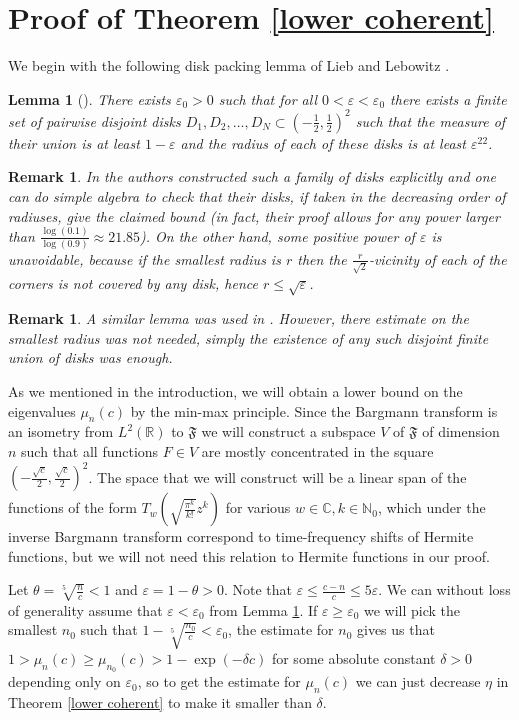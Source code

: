 \documentclass[12pt]{amsart}
\numberwithin{equation}{section}
\newcommand{\N}{\mathbb{N}}
\newcommand{\R}{\mathbb{R}}
\newcommand{\Cm}{\mathbb{C}}
\newcommand{\eps}{\varepsilon}
\newcommand{\Fo}{\mathfrak{F}}
\newtheorem{lemma}[Thm]{Lemma}
\newtheorem{remark}[Thm]{Remark}
\begin{document}
\section{Proof of Theorem \ref{lower coherent}}
We begin with the following disk packing lemma of Lieb and Lebowitz \cite{Lieb}.
\begin{lemma}[{\cite[Lemma 4.1]{Lieb}}]\label{lem}
There exists $\eps_0 > 0$ such that for all $0 < \eps < \eps_0$ there exists a finite set of pairwise disjoint disks $D_1, D_2, \ldots , D_N\subset (-\frac{1}{2}, \frac{1}{2})^2$ such that the measure of their union is at least $1-\eps$ and the radius of each of these disks is at least $\eps^{22}$. 
\end{lemma}
\begin{remark} In \cite{Lieb} the authors constructed such a family of disks explicitly and one can do simple algebra to check that their disks, if taken in the decreasing order of radiuses, give the claimed bound (in fact, their proof allows for any power larger than $\frac{\log(0.1)}{\log(0.9)}\approx 21.85$). On the other hand, some positive power of $\eps$ is unavoidable, because if the smallest radius is $r$ then the $\frac{r}{\sqrt{2}}$-vicinity of each of the corners is not covered by any disk, hence $r\le \sqrt{\eps}$.
\end{remark}
\begin{remark} A similar lemma was used in \cite{Kulikov}. However, there estimate on the smallest radius was not needed, simply the existence of any such disjoint finite union of disks was enough.
\end{remark}
As we mentioned in the introduction, we will obtain a lower bound on the eigenvalues $\mu_n(c)$ by the min-max principle. Since the Bargmann transform is an isometry from $L^2(\R)$ to $\Fo$ we will construct a subspace $V$ of $\Fo$ of dimension $n$ such that all functions $F\in V$ are mostly concentrated in the square $\left(-\frac{\sqrt{c}}{2},\frac{\sqrt{c}}{2}\right)^2$. The space that we will construct will be a linear span of the functions of the form $T_w\left(\sqrt{\frac{\pi^k}{k!}}z^k\right)$ for various $w\in\Cm, k\in\N_0$, which under the inverse Bargmann transform correspond to time-frequency shifts of Hermite functions, but we will not need this relation to Hermite functions in our proof.

Let $\theta = \sqrt[5]{\frac{n}{c}} < 1$ and $\eps = 1 - \theta > 0$. Note that $\eps\le\frac{c-n}{c}\le 5\eps$.  We can without loss of generality assume that $\eps < \eps_0$ from Lemma \ref{lem}. If $\eps \ge \eps_0$ we will pick the smallest $n_0$ such that $1-\sqrt[5]{\frac{n_0}{c}} < \eps_0$, the estimate for $n_0$ gives us that $1 > \mu_n(c) \ge \mu_{n_0}(c) > 1-\exp(-\delta c)$ for some absolute constant $\delta > 0$ depending only on $\eps_0$, so to get the estimate for $\mu_n(c)$ we can just decrease $\eta$ in Theorem \ref{lower coherent} to make it smaller than $\delta$.
\end{document}
